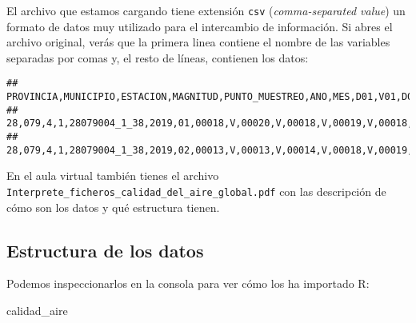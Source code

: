 \documentclass[]{article}
\newenvironment{Shaded}{\begin{snugshade}}{\end{snugshade}}
\newcommand{\NormalTok}[1]{#1}
\begin{document}
El archivo que estamos cargando tiene extensión \texttt{csv}
(\emph{comma-separated value}) un formato de datos muy utilizado para el
intercambio de información. Si abres el archivo original, verás que la
primera linea contiene el nombre de las variables separadas por comas y,
el resto de líneas, contienen los datos:

\begin{verbatim}
## PROVINCIA,MUNICIPIO,ESTACION,MAGNITUD,PUNTO_MUESTREO,ANO,MES,D01,V01,D02,V02,D03,V03,D04,V04,D05,V05,D06,V06,D07,V07,D08,V08,D09,V09,D10,V10,D11,V11,D12,V12,D13,V13,D14,V14,D15,V15,D16,V16,D17,V17,D18,V18,D19,V19,D20,V20,D21,V21,D22,V22,D23,V23,D24,V24,D25,V25,D26,V26,D27,V27,D28,V28,D29,V29,D30,V30,D31,V31
## 28,079,4,1,28079004_1_38,2019,01,00018,V,00020,V,00018,V,00019,V,00018,V,00018,V,00021,V,00020,V,00018,V,00013,V,00016,V,00016,V,00016,V,00022,V,00021,V,00016,V,00015,V,00014,V,00012,V,00014,V,00015,V,00014,V,00016,V,00017,V,00018,V,00016,V,00015,V,00015,V,00015,V,00014,V,00014,V
## 28,079,4,1,28079004_1_38,2019,02,00013,V,00013,V,00014,V,00018,V,00019,V,00019,V,00019,V,00016,V,00016,V,00014,V,00015,V,00016,V,00017,V,00017,V,00017,V,00015,V,00017,V,00018,V,00018,V,00018,V,00017,V,00020,V,00019,V,00018,V,00019,V,00018,V,00019,V,00020,V,00000,N,00000,N,00000,N
\end{verbatim}

En el aula virtual también tienes el archivo
\texttt{Interprete\_ficheros\_calidad\_del\_aire\_global.pdf} con las
descripción de cómo son los datos y qué estructura tienen.

\hypertarget{estructura-de-los-datos}{%
\subsection{Estructura de los datos}\label{estructura-de-los-datos}}

Podemos inspeccionarlos en la consola para ver cómo los ha importado R:

\begin{Shaded}
\begin{Highlighting}[]
\NormalTok{calidad_aire}
\end{Highlighting}
\end{Shaded}
\end{document}
